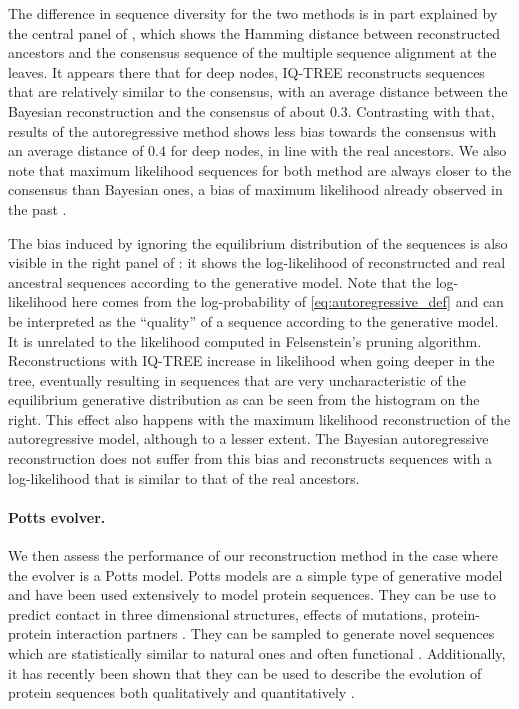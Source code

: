 The difference in sequence diversity for the two methods is in part explained by the central panel of , which shows the Hamming distance between reconstructed ancestors and the consensus sequence of the multiple sequence alignment at the leaves. 
It appears there that for deep nodes, IQ-TREE reconstructs sequences that are relatively similar to the consensus, with an average distance between the Bayesian reconstruction and the consensus of about $0.3$. 
Contrasting with that, results of the autoregressive method shows less bias towards the consensus with an average distance of $0.4$ for deep nodes, in line with the real ancestors. 
We also note that maximum likelihood sequences for both method are always closer to the consensus than Bayesian ones, a bias of maximum likelihood already observed in the past \cite{williams_assessingaccuracyancestral_2006}. 

The bias induced by ignoring the equilibrium distribution of the sequences is also visible in the right panel of : it shows the log-likelihood of reconstructed and real ancestral sequences according to the generative model. 
Note that the log-likelihood here comes from the log-probability of \eqref{eq:autoregressive_def} and can be interpreted as the ``quality'' of a sequence according to the generative model. 
It is unrelated to the likelihood computed in Felsenstein's pruning algorithm. 
Reconstructions with IQ-TREE increase in likelihood when going deeper in the tree, eventually resulting in sequences that are very uncharacteristic of the equilibrium generative distribution as can be seen from the histogram on the right. 
This effect also happens with the maximum likelihood reconstruction of the autoregressive model, although to a lesser extent. 
The Bayesian autoregressive reconstruction does not suffer from this bias and reconstructs sequences with a log-likelihood that is similar to that of the real ancestors. \\

\paragraph*{Potts evolver.} We then assess the performance of our reconstruction method in the case where the evolver is a Potts model. 
Potts models are a simple type of generative model and have been used extensively to model protein sequences. 
They can be use to predict contact in three dimensional structures, effects of mutations, protein-protein interaction partners \cite{cocco_inversestatisticalphysics_2018}. 
They can be sampled to generate novel sequences which are statistically similar to natural ones and often functional \cite{russ_evolutionbasedmodeldesigning_2020,mcgee_generativecapacityprobabilistic_2021}.
Additionally, it has recently been shown that they can be used to describe the evolution of protein sequences both qualitatively and quantitatively \cite{bisardi_modelingsequencespaceexploration_2021}.


